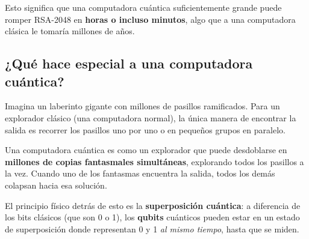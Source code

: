 Esto significa que una computadora cuántica suficientemente grande puede romper RSA-2048 en \textbf{horas o incluso minutos}, algo que a una computadora clásica le tomaría millones de años.

\subsection*{¿Qué hace especial a una computadora cuántica?}

\begin{metafora}
Imagina un laberinto gigante con millones de pasillos ramificados. Para un explorador clásico (una computadora normal), la única manera de encontrar la salida es recorrer los pasillos uno por uno o en pequeños grupos en paralelo.

Una computadora cuántica es como un explorador que puede desdoblarse en \textbf{millones de copias fantasmales simultáneas}, explorando todos los pasillos a la vez. Cuando uno de los fantasmas encuentra la salida, todos los demás colapsan hacia esa solución.
\end{metafora}

El principio físico detrás de esto es la \textbf{superposición cuántica}: a diferencia de los bits clásicos (que son 0 o 1), los \textbf{qubits} cuánticos pueden estar en un estado de superposición donde representan 0 y 1 \textit{al mismo tiempo}, hasta que se miden.


